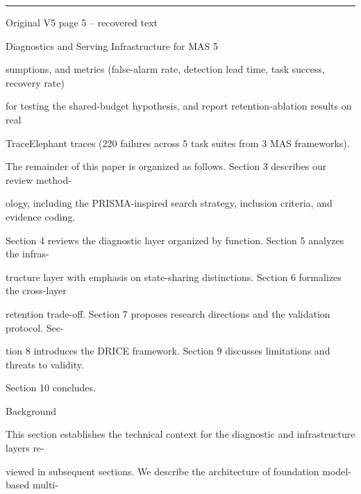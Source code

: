 \par\smallskip\noindent\rule{\textwidth}{0.4pt}\par{\sffamily\footnotesize Original V5 page 5 -- recovered text}\par\begin{flushleft}\footnotesize\ttfamily
\par\smallskip
\par\smallskip
\noindent Diagnostics and Serving Infrastructure for MAS 5\par
\par\smallskip
\par\smallskip
\par\smallskip
\noindent  sumptions, and metrics (false-alarm rate, detection lead time, task success, recovery rate)\par
\noindent  for testing the shared-budget hypothesis, and report retention-ablation results on real\par
\noindent  TraceElephant traces (220 failures across 5 task suites from 3 MAS frameworks).\par
\noindent  The remainder of this paper is organized as follows. Section 3 describes our review method-\par
\noindent ology, including the PRISMA-inspired search strategy, inclusion criteria, and evidence coding.\par
\noindent Section 4 reviews the diagnostic layer organized by function. Section 5 analyzes the infras-\par
\noindent tructure layer with emphasis on state-sharing distinctions. Section 6 formalizes the cross-layer\par
\noindent retention trade-off. Section 7 proposes research directions and the validation protocol. Sec-\par
\noindent tion 8 introduces the DRICE framework. Section 9 discusses limitations and threats to validity.\par
\noindent Section 10 concludes.\par
\par\smallskip
\par\smallskip
{} Background\par
\noindent This section establishes the technical context for the diagnostic and infrastructure layers re-\par
\noindent viewed in subsequent sections. We describe the architecture of foundation model-based multi-\par

\end{flushleft}
